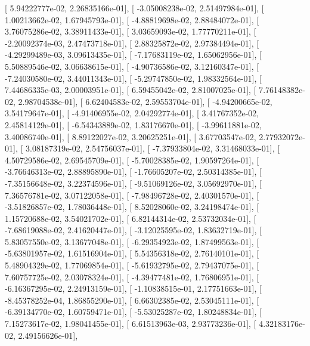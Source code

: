 \documentclass{article}
\begin{document}
       [  5.94222777e-02,   2.26835166e-01],
       [ -3.05008238e-02,   2.51497984e-01],
       [  1.00213662e-02,   1.67945793e-01],
       [ -4.88819698e-02,   2.88484072e-01],
       [  3.76075286e-02,   3.38911433e-01],
       [  3.03659093e-02,   1.77770211e-01],
       [ -2.20092374e-03,   2.47473718e-01],
       [  2.88325872e-02,   2.97384494e-01],
       [ -4.29299489e-03,   3.09613435e-01],
       [ -7.17683119e-02,   1.65062956e-01],
       [  5.50889546e-02,   3.06638615e-01],
       [ -4.90736586e-02,   3.12160347e-01],
       [ -7.24030580e-02,   3.44011343e-01],
       [ -5.29747850e-02,   1.98332564e-01],
       [  7.44686335e-03,   2.00003951e-01],
       [  6.59455042e-02,   2.81007025e-01],
       [  7.76148382e-02,   2.98704538e-01],
       [  6.62404583e-02,   2.59553704e-01],
       [ -4.94200665e-02,   3.54179647e-01],
       [ -4.91406955e-02,   2.04292774e-01],
       [  3.41767352e-02,   2.45814129e-01],
       [ -6.54343889e-02,   1.83176670e-01],
       [ -3.99611881e-02,   3.40086740e-01],
       [  8.89122027e-02,   3.20625251e-01],
       [  3.67703547e-02,   2.77932072e-01],
       [  3.08187319e-02,   2.54756037e-01],
       [ -7.37933804e-02,   3.31468033e-01],
       [  4.50729586e-02,   2.69545709e-01],
       [ -5.70028385e-02,   1.90597264e-01],
       [ -3.76646313e-02,   2.88895890e-01],
       [ -1.76605207e-02,   2.50314385e-01],
       [ -7.35156648e-02,   3.22374596e-01],
       [ -9.51069126e-02,   3.05692970e-01],
       [  7.36576781e-02,   3.07122058e-01],
       [ -7.98496728e-02,   2.40301570e-01],
       [ -3.51826857e-02,   1.78036448e-01],
       [  8.52028060e-02,   3.24198474e-01],
       [  1.15720688e-02,   3.54021702e-01],
       [  6.82144314e-02,   2.53732034e-01],
       [ -7.68619088e-02,   2.41620447e-01],
       [ -3.12025595e-02,   1.83632719e-01],
       [  5.83057550e-02,   3.13677048e-01],
       [ -6.29354923e-02,   1.87499563e-01],
       [ -5.63801957e-02,   1.61516904e-01],
       [  5.54356318e-02,   2.76140101e-01],
       [  5.48904329e-02,   1.77069854e-01],
       [ -5.61932795e-02,   2.79437075e-01],
       [  7.60757725e-02,   2.03078324e-01],
       [ -4.39477481e-02,   1.76806951e-01],
       [ -6.16367295e-02,   2.24913159e-01],
       [ -1.10838515e-01,   2.17751663e-01],
       [ -8.45378252e-04,   1.86855290e-01],
       [  6.66302385e-02,   2.53045111e-01],
       [ -6.39134770e-02,   1.60759471e-01],
       [ -5.53025287e-02,   1.80248834e-01],
       [  7.15273617e-02,   1.98041455e-01],
       [  6.61513963e-03,   2.93773236e-01],
       [  4.32183176e-02,   2.49156626e-01],
\end{document}
